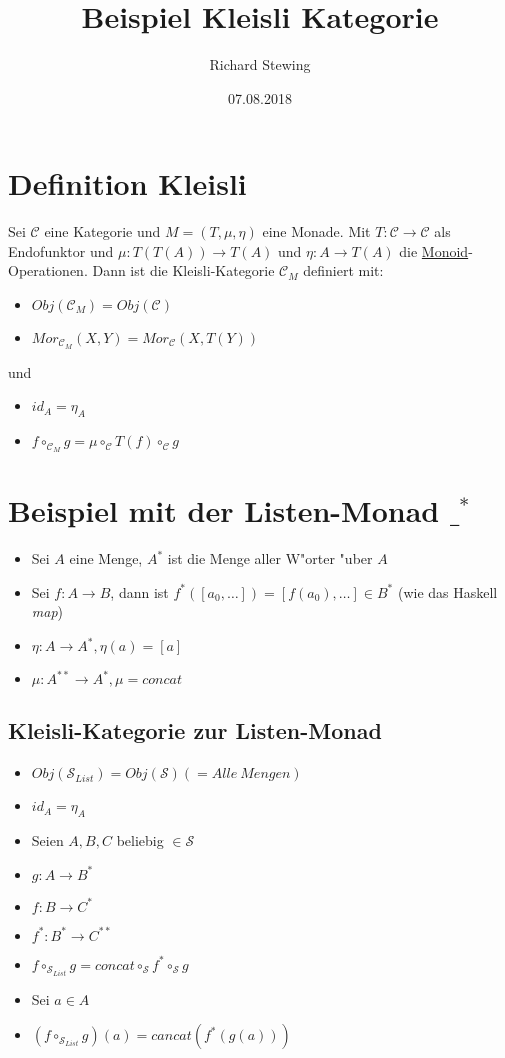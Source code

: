\documentclass[11pt]{article}
\author{Richard Stewing}
\date{07.08.2018}
\title{Beispiel Kleisli Kategorie}
\begin{document}
\maketitle

\section{Definition Kleisli}
\label{sec-1}

Sei $\mathcal{C}$ eine Kategorie und $M=(T, \mu, \eta)$ eine Monade. 
Mit $T: \mathcal{C} \to \mathcal{C}$ als Endofunktor und 
$\mu: T(T(A)) \to T(A)$ und $\eta: A \to T(A)$ die \href{https://de.wikipedia.org/wiki/Monoid}{Monoid}-Operationen.
Dann ist die Kleisli-Kategorie $\mathcal{C}_M$ definiert mit:
\begin{itemize}
\item $Obj(\mathcal{C}_M) = Obj(\mathcal{C})$
\item $Mor_{\mathcal{C}_M}(X,Y) = Mor_{\mathcal{C}}(X, T(Y))$
\end{itemize}
und 
\begin{itemize}
\item $id_A = \eta_A$
\item $f \circ_{\mathcal{C}_M} g = \mu \circ_{\mathcal{C}} T(f) \circ_{\mathcal{C}} g$
\end{itemize}

\section{Beispiel mit der Listen-Monad $\_^*$}
\label{sec-2}
\begin{itemize}
\item Sei $A$ eine Menge, $A^*$ ist die Menge aller W"orter "uber $A$
\item Sei $f:A \to B$, dann ist $f^*([a_0,\dots]) = [f(a_0),\dots] \in B^*$ (wie das Haskell \emph{map})
\item $\eta:A \to A^*, \eta(a) = [a]$
\item $\mu: A^{**} \to A^*, \mu = concat$
\end{itemize}

\subsection{Kleisli-Kategorie zur Listen-Monad}
\label{sec-2-1}

\begin{itemize}
\item $Obj(\mathcal{S}_{List}) = Obj(\mathcal{S}) (= Alle\ Mengen)$
\item $id_A = \eta_A$
\item Seien $A,B,C$ beliebig $\in \mathcal{S}$
\item $g: A \to B^*$
\item $f: B \to C^*$
\item $f^*: B^* \to C^{**}$
\item $f \circ_{\mathcal{S}_{List}} g = concat \circ_{\mathcal{S}} f^* \circ_{\mathcal{S}} g$
\item Sei $a \in A$
\item $(f \circ_{\mathcal{S}_{List}} g)(a) = cancat (f^*(g(a)))$
\end{itemize}
\end{document}
